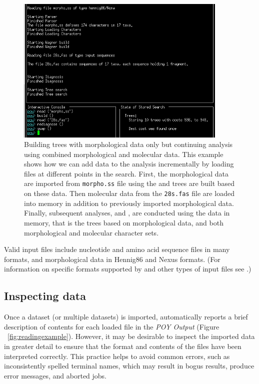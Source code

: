 {\begin{figure}[]
    \begin{center}
        \includegraphics[width=0.9\textwidth]{doc/figures/reading_example2.jpg}
    \end{center}
    \caption{Building trees with morphological data only but continuing analysis using combined morphological and 
    molecular data. This example shows how we can add data to the analysis incrementally by loading files at different 
    points in the search. First, the morphological data are imported from \texttt{morpho.ss} file using  
    the and trees are built based on these data. Then molecular data from the \texttt{28s.fas} file are loaded into memory in 
    addition to previously imported morphological data. Finally, subsequent analyses,  and 
    , are conducted using the data in memory, that is the trees based on morphological data, and 
    both morphological and molecular character sets.}
    \label{fig:reading_example2}
\end{figure}

Valid input files include nucleotide and amino acid sequence files in many formats,
and morphological data in Hennig86 and Nexus formats. (For information on specific formats supported by \poy and 
other types of input files see .)

\subsection{Inspecting data}

Once a dataset (or multiple datasets) is imported, \poy automatically reports a brief description of contents for each loaded 
file in the \emph{POY Output} (Figure ~\ref{fig:readingexample}). However, it may be desirable to inspect the imported 
data in greater detail to ensure that the format and contents of the files have been interpreted correctly. This practice helps 
to avoid common errors, such as inconsistently spelled terminal names, which may result in bogus results, produce error 
messages, and aborted jobs.

}
